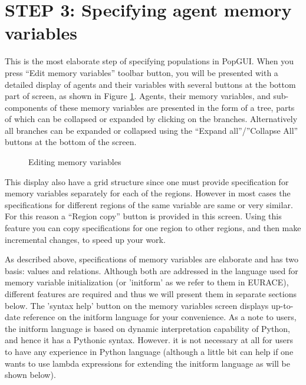 \section{STEP 3: Specifying agent memory variables}
This is the most elaborate step of specifying populations in PopGUI. When you press ``Edit memory variables'' toolbar button, you will be presented with a detailed display of agents and their variables with several buttons at the bottom part of screen, as shown in Figure \ref{fig:memvars}. Agents, their memory variables, and sub-components of these memory variables are presented in the form of a tree, parts of which can be collapsed or expanded by clicking on the branches. Alternatively all branches can be expanded or collapsed using the ``Expand all''/''Collapse All'' buttons at the bottom of the screen. 
\begin{figure}
\caption{Editing memory variables}
\label{fig:memvars}
\end{figure}

This display also have a grid structure since one must provide specification for memory variables separately for each of the regions. However in most cases the specifications for different regions of the same variable are same or very similar. For this reason a ``Region copy'' button is provided in this screen. Using this feature you can copy specifications for one region to other regions, and then make incremental changes, to speed up your work.

As described above, specifications of memory variables are elaborate and has two basis: values and relations. Although both are addressed in the language used for memory variable initialization (or 'initform' as we refer to them in EURACE), different features are required and thus we will present them in separate sections below. The 'syntax help' button on the memory variables screen displays up-to-date reference on the initform language for your convenience. As a note to users, the initform language is based on dynamic interpretation capability of Python, and hence it has a Pythonic syntax. However. it is not necessary at all for users to have any experience in Python language (although a little bit can help if one wants to use lambda expressions for extending the initform language as will be shown below).

